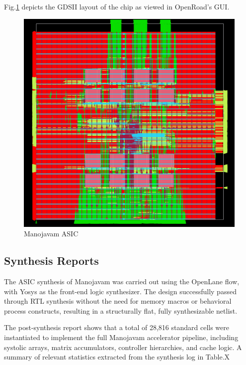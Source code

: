 Fig.\ref{fig:manojavam-asic} depicts the GDSII layout of the chip as viewed in OpenRoad's GUI.
\begin{figure}
	\centerline{\includegraphics[scale = 0.8]{Figures/manojavam_asic_layout.png}}
	\caption{Manojavam ASIC}
	\label{fig:manojavam-asic}
\end{figure}

\subsection{Synthesis Reports}
The ASIC synthesis of Manojavam was carried out using the OpenLane flow, with Yosys as the front-end logic synthesizer. The design successfully passed through RTL synthesis without the need for memory macros or behavioral process constructs, resulting in a structurally flat, fully synthesizable netlist.

The post-synthesis report shows that a total of 28,816 standard cells were instantiated to implement the full Manojavam accelerator pipeline, including systolic arrays, matrix accumulators, controller hierarchies, and cache logic. A summary of relevant statistics extracted from the synthesis log in Table.X

